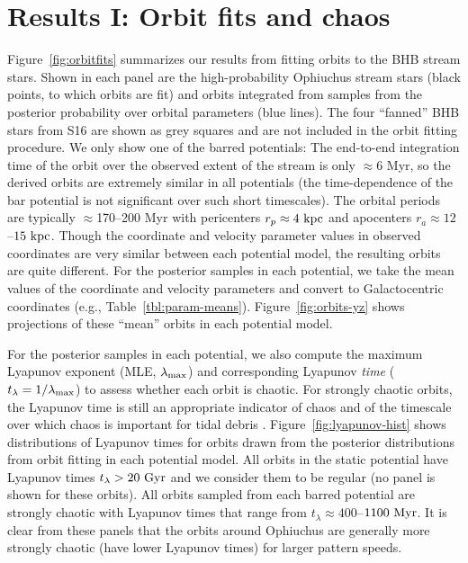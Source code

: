 \documentclass[numberedappendix]{emulateapj}
\newcommand{\lyapexp}{\lambda_{\rm max}}
\newcommand{\lyapt}{t_\lambda}
\begin{document}
\section{Results I: Orbit fits and chaos}\label{sec:results1}

Figure~\ref{fig:orbitfits} summarizes our results from fitting orbits to the BHB stream stars. Shown in each panel are the high-probability Ophiuchus stream stars (black points, to which orbits are fit) and orbits integrated from samples from the posterior probability over orbital parameters (blue lines). The four ``fanned'' BHB stars from S16 are shown as grey squares and are not included in the orbit fitting procedure. We only show one of the barred potentials: The end-to-end integration time of the orbit over the observed extent of the stream is only $\approx$6 Myr, so the derived orbits are extremely similar in all potentials (the time-dependence of the bar potential is not significant over such short timescales). The orbital periods are typically $\approx$170--200 Myr with pericenters $r_p \approx 4~{\rm kpc}$ and apocenters $r_a \approx 12$--$15~{\rm kpc}$. Though the coordinate and velocity parameter values in observed coordinates are very similar between each potential model, the resulting orbits are quite different. For the posterior samples in each potential, we take the mean values of the coordinate and velocity parameters and convert to Galactocentric coordinates (e.g., Table~\ref{tbl:param-means}). Figure~\ref{fig:orbits-yz} shows projections of these ``mean'' orbits in each potential model.

For the posterior samples in each potential, we also compute the maximum Lyapunov exponent (MLE, $\lyapexp$) and corresponding Lyapunov \emph{time} ($\lyapt = 1/\lyapexp$) to assess whether each orbit is chaotic. For strongly chaotic orbits, the Lyapunov time is still an appropriate indicator of chaos and of the timescale over which chaos is important for tidal debris \citep{apw15-chaos}. Figure~\ref{fig:lyapunov-hist} shows distributions of Lyapunov times for orbits drawn from the posterior distributions from orbit fitting in each potential model. All orbits in the static potential have Lyapunov times $\lyapt > 20~{\rm Gyr}$ and we consider them to be regular (no panel is shown for these orbits). All orbits sampled from each barred potential are strongly chaotic with Lyapunov times that range from $\lyapt \approx 400$--$1100~{\rm Myr}$. It is clear from these panels that the orbits around Ophiuchus are generally more strongly chaotic (have lower Lyapunov times) for larger pattern speeds. 
\end{document}
